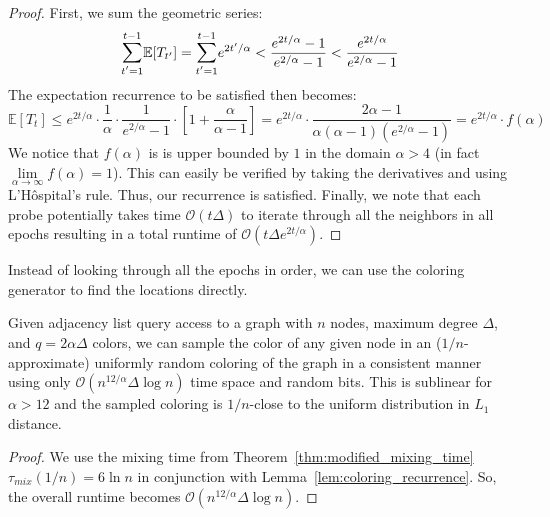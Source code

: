 \begin{proof}
First, we sum the geometric series:
\[
\mathlarger\sum\limits_{t'=1}^{t-1} \mathbb E[T_{t'}] = \mathlarger\sum\limits_{t'=1}^{t-1} e^{2t'/\alpha}
< \frac{e^{2t/\alpha}-1}{e^{2/\alpha}-1} < \frac{e^{2t/\alpha}}{e^{2/\alpha}-1}
\]
The expectation recurrence to be satisfied then becomes:
\[
\mathbb E[T_t]\le e^{2t/\alpha}\cdot \frac 1{\alpha}\cdot \frac{1}{e^{2/\alpha}-1}\cdot \left[ 1+ \frac{\alpha}{\alpha-1} \right]
= e^{2t/\alpha}\cdot \frac{2\alpha-1}{\alpha(\alpha-1)(e^{2/\alpha}-1)} = e^{2t/\alpha}\cdot f(\alpha)
\]
We notice that $f(\alpha)$ is is upper bounded by $1$ in the domain $\alpha> 4$ (in fact $\lim\limits_{\alpha\to\infty}f(\alpha) = 1$).
This can easily be verified by taking the derivatives and using L'H\^{o}spital's rule.
Thus, our recurrence is satisfied.
Finally, we note that each probe potentially takes time $\mathcal O(t\Delta)$ to iterate through all the neighbors in all epochs
resulting in a total runtime of $\mathcal O(t\Delta e^{2t/\alpha})$.
\end{proof}

\begin{corollary}
\label{cor:coloring_improved_probes}
Instead of looking through all the epochs in order, we can use the coloring generator  to find the locations directly.
\end{corollary}

\begin{theorem}
\label{thm:coloring_generator_main}
Given adjacency list query access to a graph with $n$ nodes, maximum degree $\Delta$, and $q=2\alpha\Delta$ colors,
we can sample the color of any given node in an ($1/n$-approximate) uniformly random coloring of the graph in a consistent manner
using only $\mathcal O(n^{12/\alpha}\Delta\log n)$ time space and random bits.
This is sublinear for $\alpha>12$ and the sampled coloring is $1/n$-close to the uniform distribution in $L_1$ distance.
\end{theorem}
\begin{proof}
We use the mixing time from Theorem~\ref{thm:modified_mixing_time} $\tau_{mix}(1/n) = 6\ln n$ in conjunction with Lemma~\ref{lem:coloring_recurrence}.
So, the overall runtime becomes $\mathcal O(n^{12/\alpha}\Delta\log n)$.
\end{proof}

